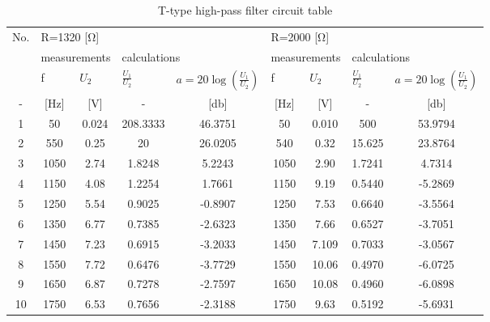\begin{table}[hptb]
        \centering
	\caption{T-type high-pass filter circuit table}
	\label{tab:tab1}
        \begin{tabular}{|c|c|c|c|c|c|c|c|c|}
        \hline
        \multirow{3}{*}{No.} & 
        \multicolumn{4}{l|}{R=1320 [\unit{\ohm}]} & 
        \multicolumn{4}{l|}{R=2000 [\unit{\ohm}]} \\
        \cline{2-9} & 
        \multicolumn{2}{l|}{measurements} & 
        \multicolumn{2}{l|}{calculations} & 
        \multicolumn{2}{l|}{measurements} & 
        \multicolumn{2}{l|}{calculations} \\ 
        \cline{2-9} & 
        \multicolumn{1}{l|}{f} &
        \multicolumn{1}{l|}{$U_2$} & 
        \multicolumn{1}{l|}{$\frac{U_1}{U_2}$} &
        \multicolumn{1}{l|}{$a=20\log(\frac{U_1}{U_2})$}& 
        \multicolumn{1}{l|}{f} & 
        \multicolumn{1}{l|}{$U_2$} & 
        \multicolumn{1}{l|}{$\frac{U_1}{U_2}$} & 
        \multicolumn{1}{l|}{$a=20\log(\frac{U_1}{U_2})$}\\ 
        \hline
        - & [\unit{\hertz}] & [\unit{\volt}] & - & [\unit{\decibel}] & [\unit{\hertz}] & [\unit{\volt}] & - & [\unit{\decibel}] \\
		\hline
        1 & 50 & 0.024 & 208.3333 & 46.3751 & 50 & 0.010 & 500 & 53.9794 \\
        \hline
        2 & 550 & 0.25 & 20 & 26.0205 & 540 & 0.32 & 15.625 & 23.8764 \\
        \hline
        3 & 1050 & 2.74 & 1.8248 & 5.2243 & 1050 & 2.90 & 1.7241 & 4.7314 \\
        \hline
        4 & 1150 & 4.08 & 1.2254 & 1.7661 & 1150 & 9.19 & 0.5440 & -5.2869 \\
        \hline
        5 & 1250 & 5.54 & 0.9025 & -0.8907 & 1250 & 7.53 & 0.6640 & -3.5564 \\
        \hline
        6 & 1350 & 6.77 & 0.7385 & -2.6323 & 1350 & 7.66 & 0.6527 & -3.7051 \\
        \hline
        7 & 1450 & 7.23 & 0.6915 & -3.2033 & 1450 & 7.109 & 0.7033 & -3.0567 \\
        \hline
        8 & 1550 & 7.72 & 0.6476 & -3.7729 & 1550 & 10.06 & 0.4970 & -6.0725 \\
        \hline
        9 & 1650 & 6.87 & 0.7278 & -2.7597 & 1650 & 10.08 & 0.4960 & -6.0898 \\
        \hline
        10 & 1750 & 6.53 & 0.7656 & -2.3188 & 1750 & 9.63 & 0.5192 & -5.6931 \\

\end{tabular}
\end{table}
